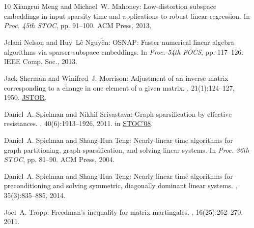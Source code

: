 \documentclass[11pt]{article}
\numberwithin{equation}{section}
\theoremstyle{definition}
\theoremstyle{plain}
\begin{document}
\begin{thebibliography}{10}
{\sc Xiangrui Meng and Michael~W. Mahoney}: Low-distortion subspace embeddings
  in input-sparsity time and applications to robust linear regression.
\newblock In {\em Proc. 45th STOC}, pp. 91--100. ACM Press, 2013.

{\sc Jelani Nelson and Huy~L\^{e} Nguy$\tilde{\hat{\mbox{e}}}$n}: {OSNAP}:
  Faster numerical linear algebra algorithms via sparser subspace embeddings.
\newblock In {\em Proc. 54th FOCS}, pp. 117--126. IEEE Comp. Soc., 2013.

{\sc Jack Sherman and Winifred~J. Morrison}: Adjustment of an inverse matrix
  corresponding to a change in one element of a given matrix.
, 21(1):124--127, 1950.
\newblock \href{https://www.jstor.org/stable/2236561}{JSTOR}.

{\sc Daniel~A. Spielman and Nikhil Srivastava}: Graph sparsification by
  effective resistances.
, 40(6):1913--1926, 2011.
\newblock \prelim in \href{https://doi.org/10.1145/1374376.1374456}{STOC'08}.

{\sc Daniel~A. Spielman and Shang-Hua Teng}: Nearly-linear time algorithms for
  graph partitioning, graph sparsification, and solving linear systems.
\newblock In {\em Proc. 36th STOC}, pp. 81--90. ACM Press, 2004.

{\sc Daniel~A. Spielman and Shang-Hua Teng}: Nearly linear time algorithms for
  preconditioning and solving symmetric, diagonally dominant linear systems.
, 35(3):835--885, 2014.
\newblock [\epfmtdoi{10.1137/090771430}]

{\sc Joel~A. Tropp}: Freedman's inequality for matrix martingales.
, 16(25):262--270, 2011.

\end{thebibliography}
\end{document}
